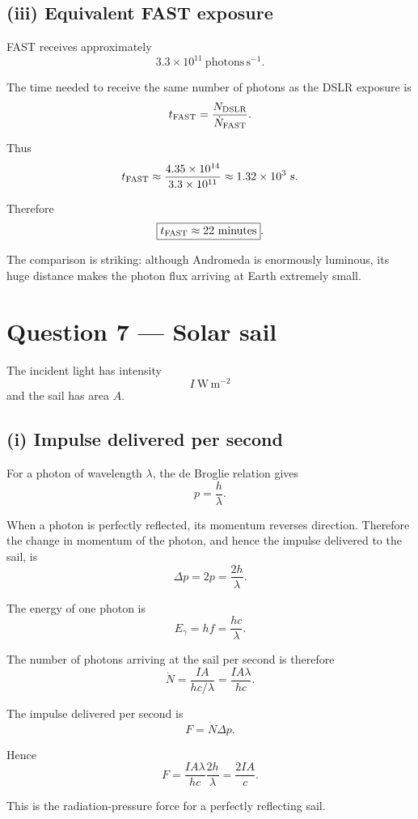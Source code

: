 \documentclass[11pt,a4paper]{article}
\begin{document}
\subsection{(iii) Equivalent FAST exposure}

FAST receives approximately
\[
3.3\times10^{11}\ \mathrm{photons\,s^{-1}}.
\]

The time needed to receive the same number of photons as the DSLR exposure is
\[
t_{\rm FAST}
=
\frac{N_{\rm DSLR}}{\dot N_{\rm FAST}}.
\]

Thus
\[
t_{\rm FAST}
\approx
\frac{4.35\times10^{14}}
{3.3\times10^{11}}
\approx1.32\times10^3\ \mathrm s.
\]

Therefore
\[
\boxed{t_{\rm FAST}\approx22\ \mathrm{minutes}}.
\]

The comparison is striking: although Andromeda is enormously luminous, its huge
distance makes the photon flux arriving at Earth extremely small.

\section{Question 7 --- Solar sail}

The incident light has intensity
\[
I\ \mathrm{W\,m^{-2}}
\]
and the sail has area $A$.

\subsection{(i) Impulse delivered per second}

For a photon of wavelength $\lambda$, the de Broglie relation gives
\[
p=\frac{h}{\lambda}.
\]

When a photon is perfectly reflected, its momentum reverses direction. Therefore
the change in momentum of the photon, and hence the impulse delivered to the sail,
is
\[
\Delta p=2p=\frac{2h}{\lambda}.
\]

The energy of one photon is
\[
E_\gamma=hf=\frac{hc}{\lambda}.
\]

The number of photons arriving at the sail per second is therefore
\[
\dot N
=
\frac{IA}{hc/\lambda}
=
\frac{IA\lambda}{hc}.
\]

The impulse delivered per second is
\[
F
=
\dot N\Delta p.
\]

Hence
\[
F
=
\frac{IA\lambda}{hc}
\frac{2h}{\lambda}
=
\boxed{\frac{2IA}{c}}.
\]

This is the radiation-pressure force for a perfectly reflecting sail.
\end{document}
